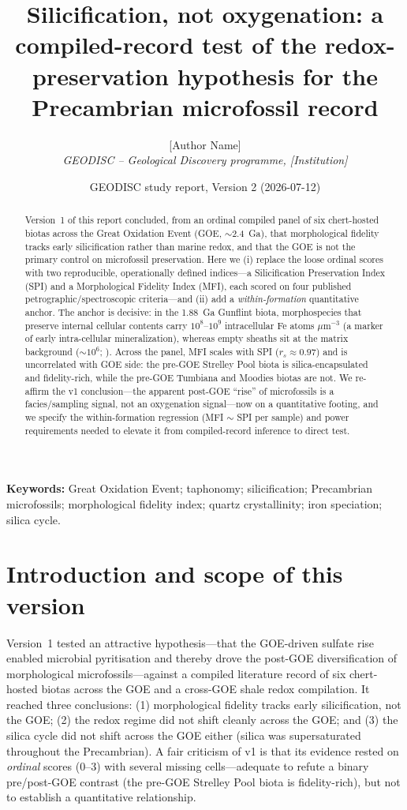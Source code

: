 \documentclass[11pt]{article}
\title{\vspace{-1.0cm}\textbf{Silicification, not oxygenation: a compiled-record test of the
redox-preservation hypothesis for the Precambrian microfossil record}}
\author{[Author Name]\\
\small\textit{GEODISC -- Geological Discovery programme, [Institution]}}
\date{\small GEODISC study report, Version 2 (2026-07-12)}
\begin{document}
\maketitle

\begin{abstract}\small
\noindent Version~1 of this report concluded, from an ordinal compiled panel of six chert-hosted
biotas across the Great Oxidation Event (GOE, $\sim$2.4~Ga), that morphological fidelity tracks
early silicification rather than marine redox, and that the GOE is not the primary control on
microfossil preservation. Here we (i) replace the loose ordinal scores with two reproducible,
operationally defined indices---a Silicification Preservation Index (SPI) and a Morphological Fidelity
Index (MFI), each scored on four published petrographic/spectroscopic criteria---and (ii) add a
\emph{within-formation} quantitative anchor. The anchor is decisive: in the 1.88~Ga Gunflint biota,
morphospecies that preserve internal cellular contents carry $10^{8}$--$10^{9}$ intracellular Fe
atoms $\mu$m$^{-3}$ (a marker of early intra-cellular mineralization), whereas empty sheaths sit at
the matrix background ($\sim$$10^{6}$; \citealp{Lepot2017}). Across the panel, MFI scales with SPI
($r_{s}\approx0.97$) and is uncorrelated with GOE side: the pre-GOE Strelley Pool biota is
silica-encapsulated and fidelity-rich, while the pre-GOE Tumbiana and Moodies biotas are not. We
re-affirm the v1 conclusion---the apparent post-GOE ``rise'' of microfossils is a facies/sampling
signal, not an oxygenation signal---now on a quantitative footing, and we specify the
within-formation regression (MFI $\sim$ SPI per sample) and power requirements needed to elevate it
from compiled-record inference to direct test.
\end{abstract}

\noindent\textbf{Keywords:} Great Oxidation Event; taphonomy; silicification; Precambrian microfossils;
morphological fidelity index; quartz crystallinity; iron speciation; silica cycle.

\section{Introduction and scope of this version}

Version~1 \citep{v1} tested an attractive hypothesis---that the GOE-driven sulfate rise enabled
microbial pyritisation and thereby drove the post-GOE diversification of morphological
microfossils---against a compiled literature record of six chert-hosted biotas across the GOE and a
cross-GOE shale redox compilation. It reached three conclusions: (1) morphological fidelity tracks
early silicification, not the GOE; (2) the redox regime did not shift cleanly across the GOE; and
(3) the silica cycle did not shift across the GOE either (silica was supersaturated throughout the
Precambrian). A fair criticism of v1 is that its evidence rested on \emph{ordinal} scores
(0--3) with several missing cells---adequate to refute a binary pre/post-GOE contrast (the
pre-GOE Strelley Pool biota is fidelity-rich), but not to establish a quantitative relationship.
\end{document}
